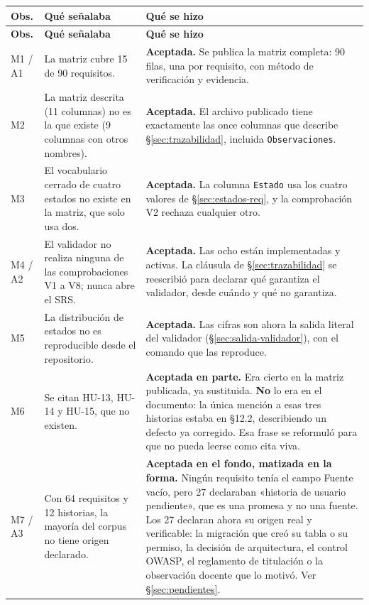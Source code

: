 \documentclass[11pt,a4paper]{article}
\begin{document}
\begin{longtable}{p{1.1cm} p{5.3cm} p{8.1cm}}
\toprule
\textbf{Obs.} & \textbf{Qué señalaba} & \textbf{Qué se hizo} \\
\midrule
\endfirsthead
\toprule
\textbf{Obs.} & \textbf{Qué señalaba} & \textbf{Qué se hizo} \\
\midrule
\endhead
M1 / A1 & La matriz cubre 15 de 90 requisitos. & \textbf{Aceptada.} Se publica la matriz completa:
90 filas, una por requisito, con método de verificación y evidencia. \\
M2 & La matriz descrita (11 columnas) no es la que existe (9 columnas con otros nombres). &
\textbf{Aceptada.} El archivo publicado tiene exactamente las once columnas que describe
\S\ref{sec:trazabilidad}, incluida \texttt{Observaciones}. \\
M3 & El vocabulario cerrado de cuatro estados no existe en la matriz, que solo usa dos. &
\textbf{Aceptada.} La columna \texttt{Estado} usa los cuatro valores de
\S\ref{sec:estados-req}, y la comprobación V2 rechaza cualquier otro. \\
M4 / A2 & El validador no realiza ninguna de las comprobaciones V1 a V8; nunca abre el SRS. &
\textbf{Aceptada.} Las ocho están implementadas y activas. La cláusula de
\S\ref{sec:trazabilidad} se reescribió para declarar qué garantiza el validador, desde cuándo y
qué no garantiza. \\
M5 & La distribución de estados no es reproducible desde el repositorio. &
\textbf{Aceptada.} Las cifras son ahora la salida literal del validador
(\S\ref{sec:salida-validador}), con el comando que las reproduce. \\
\addlinespace
M6 & Se citan HU-13, HU-14 y HU-15, que no existen. &
\textbf{Aceptada en parte.} Era cierto en la matriz publicada, ya sustituida. \textbf{No} lo era
en el documento: la única mención a esas tres historias estaba en \S12.2, describiendo un defecto
ya corregido. Esa frase se reformuló para que no pueda leerse como cita viva. \\
M7 / A3 & Con 64 requisitos y 12 historias, la mayoría del corpus no tiene origen declarado. &
\textbf{Aceptada en el fondo, matizada en la forma.} Ningún requisito tenía el campo Fuente
vacío, pero 27 declaraban «historia de usuario pendiente», que es una promesa y no una fuente.
Los 27 declaran ahora su origen real y verificable: la migración que creó su tabla o su permiso,
la decisión de arquitectura, el control OWASP, el reglamento de titulación o la observación
docente que lo motivó. Ver \S\ref{sec:pendientes}. \\

\end{longtable}
\end{document}
